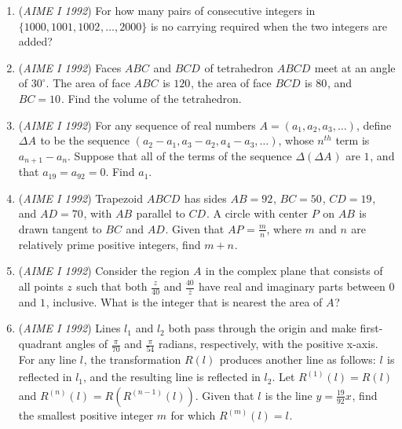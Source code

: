 \begin{enumerate}
 

	\item (\textit{AIME I 1992}) For how many pairs of consecutive integers in $\{1000,1001,1002^{}_{},\ldots,2000\}$ is no carrying required when the two integers are added?


 

	\item (\textit{AIME I 1992}) Faces $ABC^{}_{}$ and $BCD^{}_{}$ of tetrahedron $ABCD^{}_{}$ meet at an angle of $30^\circ$. The area of face $ABC^{}_{}$ is $120^{}_{}$, the area of face $BCD^{}_{}$ is $80^{}_{}$, and $BC=10^{}_{}$. Find the volume of the tetrahedron.


 

	\item (\textit{AIME I 1992}) For any sequence of real numbers $A=(a_1,a_2,a_3,\ldots)$, define $\Delta A^{}_{}$ to be the sequence $(a_2-a_1,a_3-a_2,a_4-a_3,\ldots)$, whose $n^{th}$ term is $a_{n+1}-a_n^{}$. Suppose that all of the terms of the sequence $\Delta(\Delta A^{}_{})$ are $1^{}_{}$, and that $a_{19}=a_{92}^{}=0$. Find $a_1^{}$.


 

	\item (\textit{AIME I 1992}) Trapezoid $ABCD^{}_{}$ has sides $AB=92^{}_{}$, $BC=50^{}_{}$, $CD=19^{}_{}$, and $AD=70^{}_{}$, with $AB^{}_{}$ parallel to $CD^{}_{}$. A circle with center $P^{}_{}$ on $AB^{}_{}$ is drawn tangent to $BC^{}_{}$ and $AD^{}_{}$. Given that $AP^{}_{}=\frac mn$, where $m^{}_{}$ and $n^{}_{}$ are relatively prime positive integers, find $m+n^{}_{}$.


 

	\item (\textit{AIME I 1992}) Consider the region $A^{}_{}$ in the complex plane that consists of all points $z^{}_{}$ such that both $\frac{z^{}_{}}{40}$ and $\frac{40^{}_{}}{\overline{z}}$ have real and imaginary parts between $0^{}_{}$ and $1^{}_{}$, inclusive. What is the integer that is nearest the area of $A^{}_{}$?


 

	\item (\textit{AIME I 1992}) Lines $l_1^{}$ and $l_2^{}$ both pass through the origin and make first-quadrant angles of $\frac{\pi}{70}$ and $\frac{\pi}{54}$ radians, respectively, with the positive x-axis. For any line $l^{}_{}$, the transformation $R(l)^{}_{}$ produces another line as follows: $l^{}_{}$ is reflected in $l_1^{}$, and the resulting line is reflected in $l_2^{}$. Let $R^{(1)}(l)=R(l)^{}_{}$ and $R^{(n)}(l)^{}_{}=R\left(R^{(n-1)}(l)\right)$. Given that $l^{}_{}$ is the line $y=\frac{19}{92}x^{}_{}$, find the smallest positive integer $m^{}_{}$ for which $R^{(m)}(l)=l^{}_{}$.



\end{enumerate}
